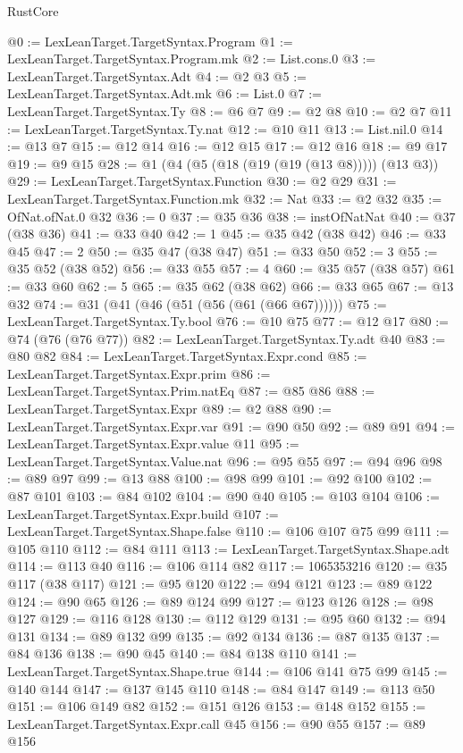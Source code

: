 \begin{lexlean}{RustCore}
\begin{coremodule}
@0 := LexLeanTarget.TargetSyntax.Program
@1 := LexLeanTarget.TargetSyntax.Program.mk
@2 := List.cons.{0}
@3 := LexLeanTarget.TargetSyntax.Adt
@4 := @2 @3
@5 := LexLeanTarget.TargetSyntax.Adt.mk
@6 := List.{0}
@7 := LexLeanTarget.TargetSyntax.Ty
@8 := @6 @7
@9 := @2 @8
@10 := @2 @7
@11 := LexLeanTarget.TargetSyntax.Ty.nat
@12 := @10 @11
@13 := List.nil.{0}
@14 := @13 @7
@15 := @12 @14
@16 := @12 @15
@17 := @12 @16
@18 := @9 @17
@19 := @9 @15
@28 := @1 (@4 (@5 (@18 (@19 (@19 (@13 @8))))) (@13 @3))
@29 := LexLeanTarget.TargetSyntax.Function
@30 := @2 @29
@31 := LexLeanTarget.TargetSyntax.Function.mk
@32 := Nat
@33 := @2 @32
@35 := OfNat.ofNat.{0} @32
@36 := 0
@37 := @35 @36
@38 := instOfNatNat
@40 := @37 (@38 @36)
@41 := @33 @40
@42 := 1
@45 := @35 @42 (@38 @42)
@46 := @33 @45
@47 := 2
@50 := @35 @47 (@38 @47)
@51 := @33 @50
@52 := 3
@55 := @35 @52 (@38 @52)
@56 := @33 @55
@57 := 4
@60 := @35 @57 (@38 @57)
@61 := @33 @60
@62 := 5
@65 := @35 @62 (@38 @62)
@66 := @33 @65
@67 := @13 @32
@74 := @31 (@41 (@46 (@51 (@56 (@61 (@66 @67))))))
@75 := LexLeanTarget.TargetSyntax.Ty.bool
@76 := @10 @75
@77 := @12 @17
@80 := @74 (@76 (@76 @77))
@82 := LexLeanTarget.TargetSyntax.Ty.adt @40
@83 := @80 @82
@84 := LexLeanTarget.TargetSyntax.Expr.cond
@85 := LexLeanTarget.TargetSyntax.Expr.prim
@86 := LexLeanTarget.TargetSyntax.Prim.natEq
@87 := @85 @86
@88 := LexLeanTarget.TargetSyntax.Expr
@89 := @2 @88
@90 := LexLeanTarget.TargetSyntax.Expr.var
@91 := @90 @50
@92 := @89 @91
@94 := LexLeanTarget.TargetSyntax.Expr.value @11
@95 := LexLeanTarget.TargetSyntax.Value.nat
@96 := @95 @55
@97 := @94 @96
@98 := @89 @97
@99 := @13 @88
@100 := @98 @99
@101 := @92 @100
@102 := @87 @101
@103 := @84 @102
@104 := @90 @40
@105 := @103 @104
@106 := LexLeanTarget.TargetSyntax.Expr.build
@107 := LexLeanTarget.TargetSyntax.Shape.false
@110 := @106 @107 @75 @99
@111 := @105 @110
@112 := @84 @111
@113 := LexLeanTarget.TargetSyntax.Shape.adt
@114 := @113 @40
@116 := @106 @114 @82
@117 := 1065353216
@120 := @35 @117 (@38 @117)
@121 := @95 @120
@122 := @94 @121
@123 := @89 @122
@124 := @90 @65
@126 := @89 @124 @99
@127 := @123 @126
@128 := @98 @127
@129 := @116 @128
@130 := @112 @129
@131 := @95 @60
@132 := @94 @131
@134 := @89 @132 @99
@135 := @92 @134
@136 := @87 @135
@137 := @84 @136
@138 := @90 @45
@140 := @84 @138 @110
@141 := LexLeanTarget.TargetSyntax.Shape.true
@144 := @106 @141 @75 @99
@145 := @140 @144
@147 := @137 @145 @110
@148 := @84 @147
@149 := @113 @50
@151 := @106 @149 @82
@152 := @151 @126
@153 := @148 @152
@155 := LexLeanTarget.TargetSyntax.Expr.call @45
@156 := @90 @55
@157 := @89 @156

\end{coremodule}
\end{lexlean}
